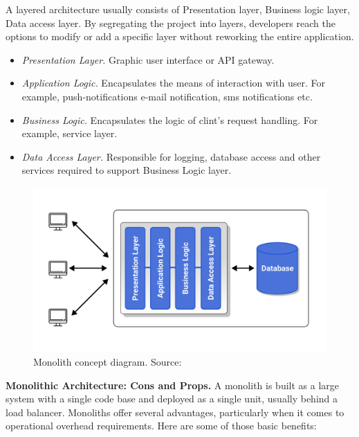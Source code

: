 A layered architecture usually consists of Presentation layer, Business logic layer, Data access layer.
By segregating the project into layers, developers reach the options to modify or add a specific layer
without reworking the entire application.

\begin{itemize}
    \item \textit{Presentation Layer.} Graphic user interface or API gateway.
    \item \textit{Application Logic.} Encapsulates the means of interaction with user.
    For example, push-notifications e-mail notification, sms notifications etc.
    \item \textit{Business Logic.} Encapsulates the logic of clint's request handling.
    For example, service layer.
    \item \textit{Data Access Layer.} Responsible for logging, database access and other services required to support
    Business Logic layer.
\end{itemize}

\begin{figure}[H]
    \centering
    \includegraphics[width=1\textwidth]{Pictures/03_Monolith_concept_diagram}
    \caption{Monolith concept diagram. Source: }\label{fig:figure2}
\end{figure}

\textbf{Monolithic Architecture: Cons and Props.} A monolith is built as a large system with a single code base and
deployed as a single unit, usually behind a load balancer.
Monoliths offer several advantages, particularly when it comes to operational overhead requirements.
Here are some of those basic benefits:

